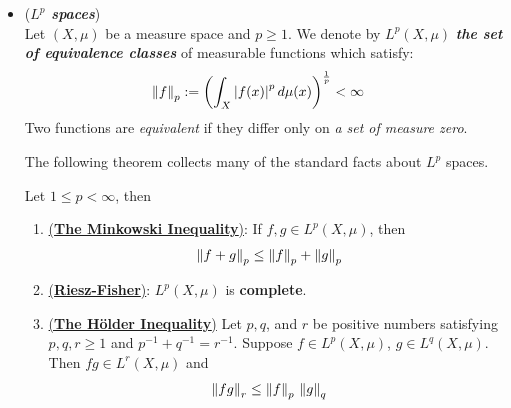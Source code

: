 \documentclass[11pt]{article}
\begin{document}
\begin{itemize}
\begin{example}
Consider the set $\kappa(\bR)$ of \emph{\textbf{continuous functions} with \textbf{compact support}}, that is, the continuous functions that \emph{vanish outside of some closed interval}.  $\kappa(\bR)$  is a \emph{\textbf{normed linear space}} under $\norm{\cdot}{\infty}$; but \emph{is \textbf{not complete}}, The \emph{\textbf{completion}} of $\kappa(\bR)$ is \emph{\textbf{not all} of $\cB\cC(\bR)$}; for example, if $f$ is the function which is identically equal to one, then I \emph{cannot be approximated by a function in $\kappa(\bR)$} since $\norm{f - g}{\infty} \ge 1$ for all $g \in \kappa(\bR)$. The \emph{\textbf{completion}} of $\kappa(\bR)$ is just $\cC_{\infty}(\bR)$, \emph{the continuous functions which \textbf{approach zero} at $\infty$}. 

Some of the most powerful theorems in functional analysis (\emph{Riesz-Markov}, \emph{Stone-Weierstrass}) are generalizations of properties of $\cB\cC(\bR)$. \qed
\end{example}

\item \begin{example} (\emph{\textbf{$L^{p}$ spaces}})\\
Let $(X, \mu)$ be a measure space and $p\ge 1$. We denote by $L^{p}(X, \mu)$ \emph{\textbf{the set of equivalence classes}} of measurable functions which satisfy:
\begin{align*}
\left\|f\right\|_{p} &:= \left(\int_{X}\left\lvert f(x) \right\rvert^p d\mu(x)\right)^{\frac{1}{p}} < \infty
\end{align*} Two functions are \emph{equivalent} if they differ only on \emph{a set of measure zero}.

The following theorem collects many of the standard facts about $L^{p}$ spaces.
\begin{theorem}
Let $1 \le p < \infty$, then
\begin{enumerate}
\item \underline{(\textbf{The Minkowski Inequality})}: If $f, g \in L^{p}(X, \mu)$, then
\begin{align*}
\left\|f +g\right\|_{p} &\le \left\|f\right\|_{p} + \left\|g\right\|_{p}
\end{align*}
\item  \underline{(\textbf{Riesz-Fisher})}:  $L^{p}(X, \mu)$ is \textbf{complete}.
\item \underline{(\textbf{The H\"older Inequality})} Let $p, q$, and $r$ be positive numbers satisfying
$p, q, r \ge 1$ and $p^{-1} +q^{-1} = r^{-1}$. Suppose  $f \in L^{p}(X, \mu)$, $g \in L^{q}(X, \mu)$. Then
$fg \in L^{r}(X, \mu)$ and
\begin{align*}
\left\|fg\right\|_{r} &\le \left\|f\right\|_{p}\,\left\|g\right\|_{q}
\end{align*}
\end{enumerate}
\end{theorem}


\end{example}
\end{itemize}
\end{document}
